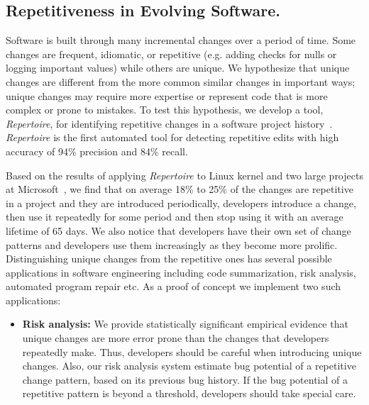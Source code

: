\documentclass[a4paper, 11pt]{article}
\begin{document}
\begin{small}

\section*{\small Repetitiveness in Evolving Software.} Software is built through many incremental changes 
over a period of time. Some changes are frequent, idiomatic, or repetitive (e.g. adding checks for nulls 
or logging important values) while others are unique. We hypothesize that unique changes are different from the more common similar 
changes in important ways;  unique changes may require more expertise or represent code that is more complex or prone to mistakes. 
To test this hypothesis, we  develop a tool, {\em Repertoire}, for identifying repetitive changes in a software project history~\cite{Ray2012:RCP}. 
{\em Repertoire} is the first automated tool for detecting repetitive edits with high accuracy of 94\% precision and 84\% recall.

Based on the results of applying {\em Repertoire} to Linux kernel and two large projects at Microsoft~\cite{ray2014unique}, 
we find that on average 18\% to 25\% of the changes are repetitive in a project and they are introduced periodically, \ie developers introduce a change, then use it repeatedly for some period and then stop using it with an average lifetime of 65 days. We also notice that developers have their own set of change patterns and developers use them increasingly as they become more prolific. Distinguishing unique changes from the 
repetitive ones has several possible applications in software engineering including code summarization, risk analysis,  automated program repair etc.
As a proof of concept we implement two such applications:

\begin{itemize}
\item \textbf{Risk analysis:} We provide statistically significant empirical evidence that unique changes are 
more error prone than the changes that developers repeatedly make. Thus, developers should be careful when introducing unique changes.
Also, our risk analysis system estimate bug potential of a repetitive change pattern, based on its previous bug history. 
If the bug potential of a repetitive pattern is beyond a threshold, developers should take special care. 


\end{itemize}
\end{small}
\end{document}

